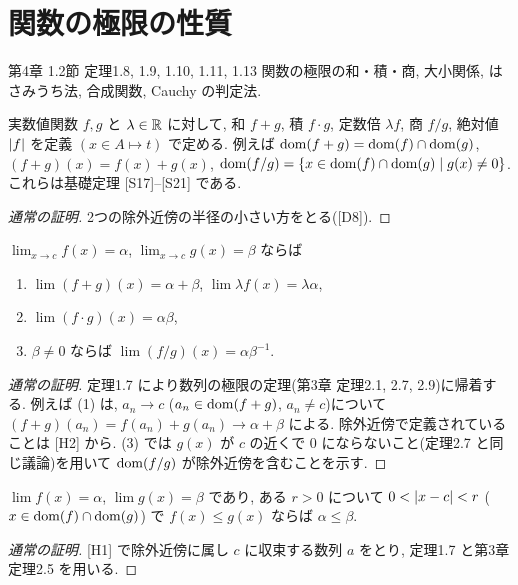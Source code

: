 \section{関数の極限の性質}

\begin{textref}{第4章 1.2節 定理1.8, 1.9, 1.10, 1.11, 1.13}
  関数の極限の和・積・商, 大小関係, はさみうち法, 合成関数, Cauchy の判定法.
\end{textref}

実数値関数 $f, g$ と $\lambda \in \mathbb{R}$ に対して, 和 $f + g$, 積 $f \cdot g$, 定数倍 $\lambda f$, 商 $f / g$, 絶対値 $\lvert f\rvert$ を定義 $(x \in A \mapsto t)$ で定める. 例えば $\mathrm{dom}(f + g) = \mathrm{dom}(f) \cap \mathrm{dom}(g)$, $(f + g)(x) = f(x) + g(x)$, $\mathrm{dom}(f/g) = \{x \in \mathrm{dom}(f) \cap \mathrm{dom}(g) \mid g(x) \neq 0\}$. これらは基礎定理 [S17]--[S21] である.

\begin{lem}\end{lem}
\begin{proof}[通常の証明]
  2つの除外近傍の半径の小さい方をとる([D8]).
\end{proof}

\begin{thm}[テキスト定理1.8]
  $\lim_{x \to c} f(x) = \alpha$, $\lim_{x \to c} g(x) = \beta$ ならば
  \begin{enumerate}[label=(\arabic*)]
    \item $\lim (f + g)(x) = \alpha + \beta$, $\lim \lambda f(x) = \lambda\alpha$,
    \item $\lim (f \cdot g)(x) = \alpha\beta$,
    \item $\beta \neq 0$ ならば $\lim (f/g)(x) = \alpha\beta^{-1}$.
  \end{enumerate}
\end{thm}
\begin{proof}[通常の証明]
  定理1.7 により数列の極限の定理(第3章 定理2.1, 2.7, 2.9)に帰着する. 例えば (1) は, $a_n \to c$ ($a_n \in \mathrm{dom}(f+g)$, $a_n \neq c$)について $(f+g)(a_n) = f(a_n) + g(a_n) \to \alpha + \beta$ による. 除外近傍で定義されていることは [H2] から. (3) では $g(x)$ が $c$ の近くで $0$ にならないこと(定理2.7 と同じ議論)を用いて $\mathrm{dom}(f/g)$ が除外近傍を含むことを示す.
\end{proof}

\begin{thm}[テキスト定理1.9]
  $\lim f(x) = \alpha$, $\lim g(x) = \beta$ であり, ある $r > 0$ について $0 < \lvert x - c\rvert < r$ ($x \in \mathrm{dom}(f) \cap \mathrm{dom}(g)$) で $f(x) \leq g(x)$ ならば $\alpha \leq \beta$.
\end{thm}
\begin{proof}[通常の証明]
  [H1] で除外近傍に属し $c$ に収束する数列 $a$ をとり, 定理1.7 と第3章定理2.5 を用いる.
\end{proof}

